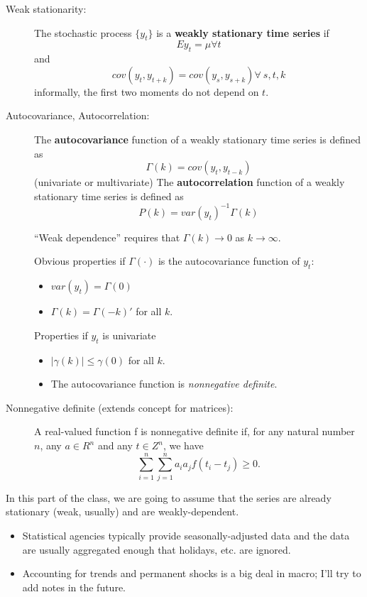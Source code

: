 \begin{description}
\item[Weak stationarity:] 
  The stochastic process $\{y_t\}$ is a \textbf{weakly stationary time
    series} if
  \[ E y_t = μ ∀t \] and 
  \[cov(y_t, y_{t+k}) = cov(y_s, y_{s+k}) ∀ \ s,t, k\] informally, the
  first two moments do not depend on $t$.
\item[Autocovariance, Autocorrelation:]
  The \textbf{autocovariance} function of a weakly stationary time
  series is defined as
  \[Γ(k) = cov(y_t, y_{t-k})\] (univariate or multivariate) The
  \textbf{autocorrelation} function of a weakly stationary time series
  is defined as
  \[Ρ(k) = var(y_t)^{-1} Γ(k)\]

  ``Weak dependence'' requires that $Γ(k) → 0$ as $k → ∞$.

  Obvious properties if $Γ(\cdot)$ is the autocovariance function of
  $y_t$:
  \begin{itemize}
  \item $var(y_t) = Γ(0)$
  \item $Γ(k) = Γ(-k)'$ for all $k$.
  \end{itemize}

  Properties if $y_t$ is univariate
  \begin{itemize} 
  \item $|γ(k)| ≤ γ(0)$ for all $k$.
  \item The autocovariance function is \emph{nonnegative definite}.
  \end{itemize}
\item[Nonnegative definite (extends concept for matrices):]

  A real-valued function f is nonnegative definite if, for any natural
  number $n$, any $a ∈ R^n$ and any $t ∈ Z^n$, we have
  \[\sum_{i=1}^n \sum_{j=1}^n a_i a_j f(t_i - t_j) ≥ 0.\]
\end{description}

In this part of the class, we are going to assume that the series are
already stationary (weak, usually) and are weakly-dependent.

\begin{itemize}
\item Statistical agencies typically provide seasonally-adjusted data
  and the data are usually aggregated enough that holidays, etc. are
  ignored.
\item Accounting for trends and permanent shocks is a big deal in
  macro; I'll try to add notes in the future.
\end{itemize}

